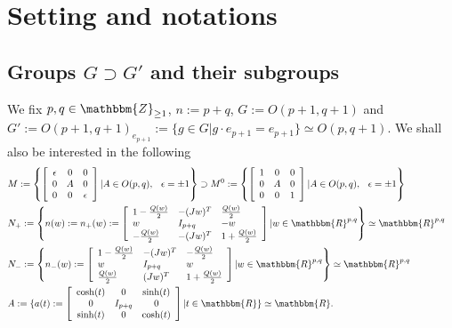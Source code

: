 \documentclass{article}
\newcommand{\assign}{:=}
\numberwithin{definition}{section}
\numberwithin{lemma}{section}
\numberwithin{proposition}{section}
{\theorembodyfont{\rmfamily}\newtheorem{remark}{Remark}
\numberwithin{remark}{section}
}
\begin{document}
\section{Setting and notations}\label{sec:def-n-nots}

\subsection{Groups $G \supset G'$ and their subgroups}

We fix $p, q \in \mathbbm{Z}_{\geq 1}$, $n \assign p + q$, $G \assign O (p +
1, q + 1)$ and $G' \assign O (p + 1, q + 1)_{e_{p + 1}} \assign \{g \in G|g
\cdot e_{p + 1} = e_{p + 1} \} \simeq O (p, q + 1)$. We shall also be
interested in the following
\begin{eqnarray}
  & M \assign \left\{ \left[ \begin{array}{ccc}
    \epsilon & 0 & 0\\
    0 & A & 0\\
    0 & 0 & \epsilon
  \end{array} \right] | A \in O (p, q), \hspace{0.75em} \epsilon = \pm 1
  \right\} \supset M^0 \assign \left\{ \left[ \begin{array}{ccc}
    1 & 0 & 0\\
    0 & A & 0\\
    0 & 0 & 1
  \end{array} \right] | A \in O (p, q), \hspace{0.75em} \epsilon = \pm 1
  \right\} &  \nonumber\\
  & N_+ \assign \left\{ n ( w) \assign n_+ ( w) \assign \left[
  \begin{array}{lll}
    1 - \frac{Q ( w)}{2} & - ( J w)^T & \frac{Q ( w)}{2}\\
    w & I_{p + q} & - w\\
    - \frac{Q ( w)}{2} & - ( J w)^T & 1 + \frac{Q ( w)}{2}
  \end{array} \right] | w \in \mathbbm{R}^{p, q} \right\} \simeq
  \mathbbm{R}^{p, q}  \label{def-n-nots:eq-N+} & \\
  & N_- \assign \left\{ n_- ( w) \assign \left[ \begin{array}{lll}
    1 - \frac{Q ( w)}{2} & - ( J w)^T & - \frac{Q ( w)}{2}\\
    w & I_{p + q} & w\\
    \frac{Q ( w)}{2} & ( J w)^T & 1 + \frac{Q ( w)}{2}
  \end{array} \right] | w \in \mathbbm{R}^{p, q} \right\} \simeq
  \mathbbm{R}^{p, q}  \label{def-n-nots:eq:N-} & \\
  & A \assign \{a (t) \assign \left[ \begin{array}{ccc}
    \cosh (t) & 0 & \sinh (t)\\
    0 & I_{p + q} & 0\\
    \sinh (t) & 0 & \cosh (t)
  \end{array} \right] |t \in \mathbbm{R}\} \simeq \mathbbm{R}. 
  \label{def-n-nots:eq-A} & 
\end{eqnarray}
\end{document}
